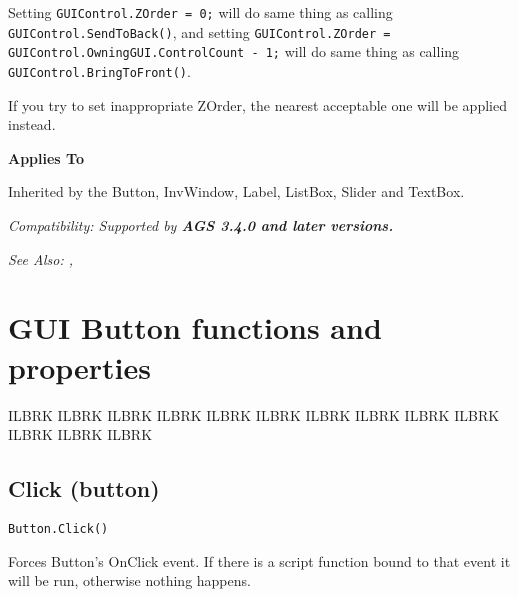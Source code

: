 Setting \verb$GUIControl.ZOrder = 0;$ will do same thing as calling \verb$GUIControl.SendToBack()$,
and setting \verb$GUIControl.ZOrder = GUIControl.OwningGUI.ControlCount - 1;$ will
do same thing as calling \verb$GUIControl.BringToFront()$.

If you try to set inappropriate ZOrder, the nearest acceptable one will be applied instead.

\bf{Applies To}

Inherited by the Button, InvWindow, Label, ListBox, Slider and TextBox.

\it{Compatibility:} Supported by \bf{AGS 3.4.0} and later versions.

\it{See Also:} ,



\section{GUI Button functions and properties}%

ILBRK
ILBRK
ILBRK
ILBRK
ILBRK
ILBRK
ILBRK
ILBRK
ILBRK
ILBRK
ILBRK
ILBRK
ILBRK


\subsection{Click (button)}\label{Button.Click}%

\begin{verbatim}
Button.Click()
\end{verbatim}
Forces Button's OnClick event. If there is a script function bound to that event it will be
run, otherwise nothing happens.

